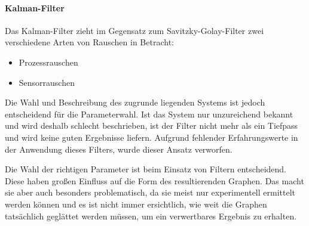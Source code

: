 \paragraph{Kalman-Filter}
Das Kalman-Filter zieht im Gegensatz zum Savitzky-Golay-Filter zwei verschiedene Arten von Rauschen in Betracht:
\begin{itemize}
\item Prozessrauschen 
\item Sensorrauschen
\end{itemize}
Die Wahl und Beschreibung des zugrunde liegenden Systems ist jedoch entscheidend für die Parameterwahl. Ist das System nur unzureichend bekannt und wird deshalb schlecht beschrieben, ist der Filter nicht mehr als ein Tiefpass und wird keine guten Ergebnisse liefern. Aufgrund fehlender Erfahrungswerte in der Anwendung dieses Filters, wurde dieser Ansatz verworfen.

Die Wahl der richtigen Parameter ist beim Einsatz von Filtern entscheidend. Diese haben großen Einfluss auf die Form des resultierenden Graphen. Das macht sie aber auch besonders problematisch, da sie meist nur experimentell ermittelt werden können und es ist nicht immer ersichtlich, wie weit die Graphen tatsächlich geglättet werden müssen, um ein verwertbares Ergebnis zu erhalten. 